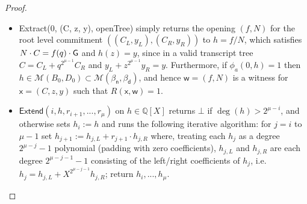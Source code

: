 \begin{proof}
\begin{itemize}


\item \textsf{Extract}(0, (C, z, y), \textsf{openTree}) simply returns the opening $(f, N)$ for the root level commitment $((C_L, y_L), (C_R, y_R))$ to $h = f/N$, which satisfies $N \cdot C = f(q) \cdot \gr{G}$ and $h(z) = y$, since in a valid transcript tree $C = C_L + q^{2^{\mu -1}} C_R$ and $y_L + z^{2^{\mu -1}} y_R = y$.  Furthermore, if $\phi_a(0, h) = 1$ then $h \in \mathcal{M}(B_0, D_0) \subset \mathcal{M}(\beta_\textsf{n}, \beta_\textsf{d})$, and hence $\mathsf{w} = (f, N)$ is a witness for $\mathsf{x} = (C, z, y)$ such that $R(\mathsf{x}, \mathsf{w}) = 1$. 



\item $\textsf{Extend}(i, h, r_{i+1},...,r_\mu)$ on $h \in \mathbb{Q}[X]$ returns $\bot$ if $\deg(h) > 2^{\mu - i}$, and otherwise sets $h_i := h$ and runs the following iterative algorithm: for $j = i$ to $\mu-1$ set $h_{j+1} := h_{j, L} + r_{j+1} \cdot h_{j,R}$ where, treating each $h_j$ as a degree $2^{\mu - j} -1$ polynomial (padding with zero coefficients), $h_{j,L}$ and $h_{j, R}$ are each degree $2^{\mu -j - 1} - 1$ consisting of the left/right coefficients of $h_j$, i.e. $h_j = h_{j,L} + X^{2^{\mu - j - 1}} h_{j,R}$; return $h_i,...,h_\mu$. 


\end{itemize}
\end{proof}
